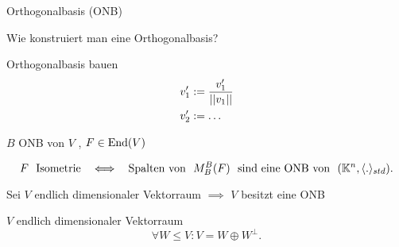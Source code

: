 \documentclass[class=article, crop=false]{standalone}
\begin{document}
\begin{zettel}{Orthogonalbasis (ONB)}
\begin{flashcard}
\begin{question}
Wie konstruiert man eine Orthogonalbasis?
\end{question}
    Orthogonalbasis bauen
    \begin{align*}
        v_1' &:= \frac{v_1'}{ \left|\left|v_1\right|\right|}\\
        v_2' &:= \dots
    \end{align*}

\end{flashcard}
$B$ ONB von $V$ , $F \in  \operatorname{End}(V)$ 
\begin{theorem}
\[
F \tx{ Isometrie } \iff  \tx{ Spalten von } M_B^B (F) \tx{ sind eine ONB von } (\mathbb{K}^n, \langle .\rangle_{std})
.\]
\end{theorem}

\begin{corollary}
    Sei $V$ endlich dimensionaler Vektorraum $\implies $ $V$ besitzt eine ONB
\end{corollary}

\begin{corollary}
    $V$ endlich dimensionaler Vektorraum 
\[
    \forall W \leq  V : V = W \oplus W^{\perp} 
.\]
\end{corollary}



\end{zettel}
\end{document}
